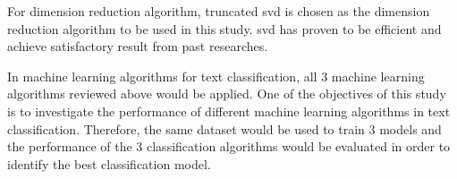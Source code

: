 For dimension reduction algorithm, truncated \ac{svd} is chosen as the dimension reduction algorithm to be used in this study. \Ac{svd} has proven to be efficient and achieve satisfactory result from past researches.
	
In machine learning algorithms for text classification, all 3 machine learning algorithms reviewed above would be applied. One of the objectives of this study is to investigate the performance of different machine learning algorithms in text classification. Therefore, the same dataset would be used to train 3 models and the performance of the 3 classification algorithms would be evaluated in order to identify the best classification model.

